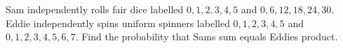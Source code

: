 Sam independently rolls fair dice labelled $0,1,2,3,4,5$ and $0,6,12,18,24,30$. Eddie independently spins uniform spinners labelled $0,1,2,3,4,5$ and $0,1,2,3,4,5,6,7$. Find the probability that Sam\textquotesingle s sum equals Eddie\textquotesingle s product.
